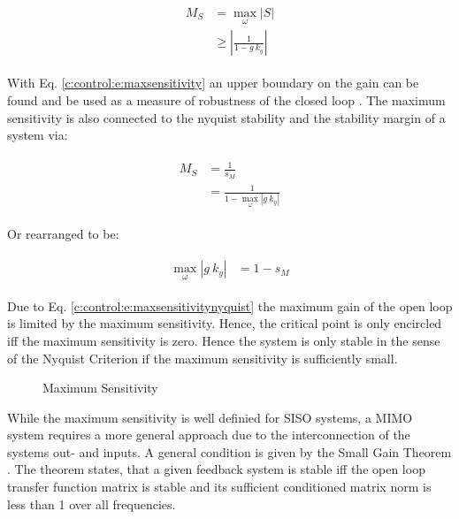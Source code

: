 \begin{align}
\begin{split}
M_S & = \max_\omega \left| S \right| \\
& \geq \left| \frac{1}{1 - g~k_y}\right|
\end{split}
\label{c:control:e:maxsensitivity}
\end{align}

With Eq. \ref{c:control:e:maxsensitivity} an upper boundary on the gain can be found and be used as a measure of robustness of the closed loop \cite[p.323 ff.]{Astrom2009}. The maximum sensitivity is also connected to the nyquist stability and the stability margin of a system via:

\begin{align}
\begin{split}
M_S &= \frac{1}{s_M} \\
&= \frac{1}{1 - \max_\omega \left| g ~k_y \right|}
\end{split}
\label{c:control:e:maxsensitivitynyquist}
\end{align}

Or rearranged to be:

\begin{align}
\begin{split}
\max_\omega \left| g~k_y\right| &= 1 - s_M
\end{split}
\end{align}

Due to Eq. \ref{c:control:e:maxsensitivitynyquist} the maximum gain of the open loop is limited by the maximum sensitivity. Hence, the critical point is only encircled iff the maximum sensitivity is zero. Hence the system is only stable in the sense of the Nyquist Criterion if the maximum sensitivity is sufficiently small.\\

\begin{figure}[H]
\begin{minipage}[b]{\textwidth}
\centering

\caption{Maximum Sensitivity}
\label{c:control:f:MaximumSensitivity}
\end{minipage}
\end{figure}


While the maximum sensitivity is well definied for SISO systems, a MIMO system requires a more general approach due to the interconnection of the systems out- and inputs. A general condition is given by the Small Gain Theorem \cite[p.150 ff.]{Skogestad2005MultivariableDesign}. The theorem states, that a given feedback system is stable iff the open loop transfer function matrix is stable and its sufficient conditioned matrix norm is less than 1 over all frequencies.

